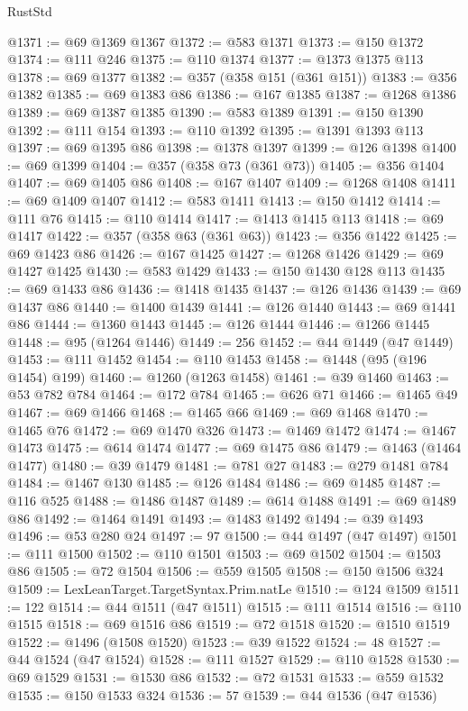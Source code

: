 \begin{lexlean}{RustStd}
\begin{coremodule}
@1371 := @69 @1369 @1367
@1372 := @583 @1371
@1373 := @150 @1372
@1374 := @111 @246
@1375 := @110 @1374
@1377 := @1373 @1375 @113
@1378 := @69 @1377
@1382 := @357 (@358 @151 (@361 @151))
@1383 := @356 @1382
@1385 := @69 @1383 @86
@1386 := @167 @1385
@1387 := @1268 @1386
@1389 := @69 @1387 @1385
@1390 := @583 @1389
@1391 := @150 @1390
@1392 := @111 @154
@1393 := @110 @1392
@1395 := @1391 @1393 @113
@1397 := @69 @1395 @86
@1398 := @1378 @1397
@1399 := @126 @1398
@1400 := @69 @1399
@1404 := @357 (@358 @73 (@361 @73))
@1405 := @356 @1404
@1407 := @69 @1405 @86
@1408 := @167 @1407
@1409 := @1268 @1408
@1411 := @69 @1409 @1407
@1412 := @583 @1411
@1413 := @150 @1412
@1414 := @111 @76
@1415 := @110 @1414
@1417 := @1413 @1415 @113
@1418 := @69 @1417
@1422 := @357 (@358 @63 (@361 @63))
@1423 := @356 @1422
@1425 := @69 @1423 @86
@1426 := @167 @1425
@1427 := @1268 @1426
@1429 := @69 @1427 @1425
@1430 := @583 @1429
@1433 := @150 @1430 @128 @113
@1435 := @69 @1433 @86
@1436 := @1418 @1435
@1437 := @126 @1436
@1439 := @69 @1437 @86
@1440 := @1400 @1439
@1441 := @126 @1440
@1443 := @69 @1441 @86
@1444 := @1360 @1443
@1445 := @126 @1444
@1446 := @1266 @1445
@1448 := @95 (@1264 @1446)
@1449 := 256
@1452 := @44 @1449 (@47 @1449)
@1453 := @111 @1452
@1454 := @110 @1453
@1458 := @1448 (@95 (@196 @1454) @199)
@1460 := @1260 (@1263 @1458)
@1461 := @39 @1460
@1463 := @53 @782 @784
@1464 := @172 @784
@1465 := @626 @71
@1466 := @1465 @49
@1467 := @69 @1466
@1468 := @1465 @66
@1469 := @69 @1468
@1470 := @1465 @76
@1472 := @69 @1470 @326
@1473 := @1469 @1472
@1474 := @1467 @1473
@1475 := @614 @1474
@1477 := @69 @1475 @86
@1479 := @1463 (@1464 @1477)
@1480 := @39 @1479
@1481 := @781 @27
@1483 := @279 @1481 @784
@1484 := @1467 @130
@1485 := @126 @1484
@1486 := @69 @1485
@1487 := @116 @525
@1488 := @1486 @1487
@1489 := @614 @1488
@1491 := @69 @1489 @86
@1492 := @1464 @1491
@1493 := @1483 @1492
@1494 := @39 @1493
@1496 := @53 @280 @24
@1497 := 97
@1500 := @44 @1497 (@47 @1497)
@1501 := @111 @1500
@1502 := @110 @1501
@1503 := @69 @1502
@1504 := @1503 @86
@1505 := @72 @1504
@1506 := @559 @1505
@1508 := @150 @1506 @324
@1509 := LexLeanTarget.TargetSyntax.Prim.natLe
@1510 := @124 @1509
@1511 := 122
@1514 := @44 @1511 (@47 @1511)
@1515 := @111 @1514
@1516 := @110 @1515
@1518 := @69 @1516 @86
@1519 := @72 @1518
@1520 := @1510 @1519
@1522 := @1496 (@1508 @1520)
@1523 := @39 @1522
@1524 := 48
@1527 := @44 @1524 (@47 @1524)
@1528 := @111 @1527
@1529 := @110 @1528
@1530 := @69 @1529
@1531 := @1530 @86
@1532 := @72 @1531
@1533 := @559 @1532
@1535 := @150 @1533 @324
@1536 := 57
@1539 := @44 @1536 (@47 @1536)

\end{coremodule}
\end{lexlean}
